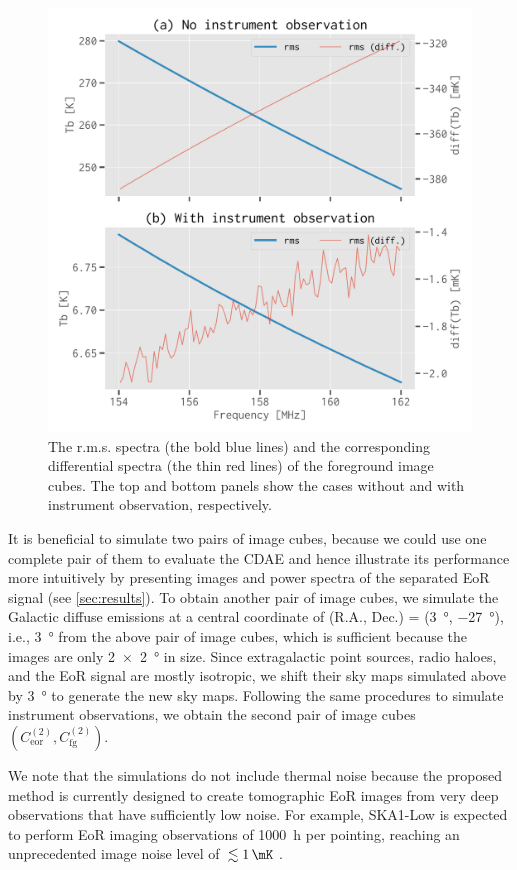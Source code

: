 \documentclass[fleqn,usenatbib]{mnras}
\newlength{\myfigwidth}
\newcommand{\R}[1]{\mathrm{#1}}
\newcommand{\editwip}[1]{{\leavevmode\color{magenta}#1}}
\begin{document}
\begin{figure}
  \centering
  \includegraphics[width=\myfigwidth]{simudata}
  \caption{\label{fig:simudata}\editwip{%
    The r.m.s\@. spectra (the bold blue lines) and the corresponding
    differential spectra (the thin red lines) of the foreground image
    cubes.} %
    The top and bottom panels show the cases without and with instrument
    observation, respectively.
  }
\end{figure}

\editwip{%
It is beneficial to simulate two pairs of image cubes, because we could use
one complete pair of them to evaluate the CDAE and hence illustrate its
performance more intuitively by presenting images and power spectra of the
separated EoR signal (see \autoref{sec:results}).
To obtain another pair of image cubes, we simulate the Galactic diffuse
emissions at a central coordinate of (R.A., Dec\@.) = (\SI{3}{\degree},
\SI{-27}{\degree}), i.e., \SI{3}{\degree} from the above pair of image
cubes, which is sufficient because the images are only \SI{2 x 2}{\degree}
in size.
Since extragalactic point sources, radio haloes, and the EoR signal are
mostly isotropic, we shift their sky maps simulated above by
\SI{3}{\degree} to generate the new sky maps.
Following the same procedures to simulate instrument observations, we
obtain the second pair of image cubes
$\left( C_{\R{eor}}^{(2)}, C_{\R{fg}}^{(2)} \right)$.

We note that the simulations do not include thermal noise because the
proposed method is currently designed to create tomographic EoR images
from very deep observations that have sufficiently low noise.
For example, SKA1-Low is expected to perform EoR imaging observations of
\SI{1000}{\hour} per pointing, reaching an unprecedented image noise level
of $\,\lesssim \SI{1}{\mK}$ \citep[e.g.,][]{mellema2013rev,koopmans2015rev}.
} %
\end{document}
